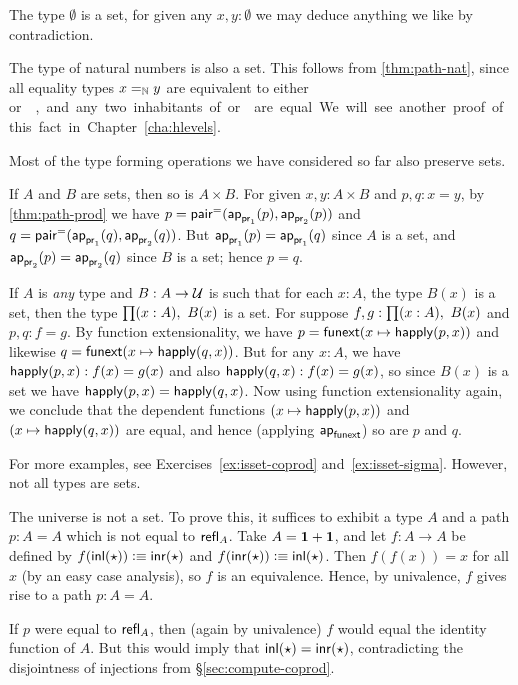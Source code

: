 \begin{eg}
  The type $\emptyset$ is a set, for given any $x,y:\emptyset$ we may deduce anything we like by contradiction.
\end{eg}

\begin{eg}
  The type \nat of natural numbers is also a set.
  This follows from \autoref{thm:path-nat}, since all equality types $\id[\nat]xy$ are equivalent to either \unit or \emptyt, and any two inhabitants of \unit or \emptyt are equal.
  We will see another proof of this fact in Chapter~\ref{cha:hlevels}.
\end{eg}

Most of the type forming operations we have considered so far also preserve sets.

\begin{eg}\label{thm:isset-prod}
  If $A$ and $B$ are sets, then so is $A\times B$.
  For given $x,y:A\times B$ and $p,q:x=y$, by \autoref{thm:path-prod} we have $p= \pairpath(\projpath1(p),\projpath2(p))$ and $q= \pairpath(\projpath1(q),\projpath2(q))$.
  But $\projpath1(p)=\projpath1(q)$ since $A$ is a set, and $\projpath2(p)=\projpath2(q)$ since $B$ is a set; hence $p=q$.
\end{eg}

\begin{eg}\label{thm:isset-forall}
  If $A$ is \emph{any} type and $B:A\to \type$ is such that for each $x:A$, the type $B(x)$ is a set, then the type $\prd{x:A} B(x)$ is a set.
  For suppose $f,g:\prd{x:A} B(x)$ and $p,q:f=g$.
  By function extensionality, we have $p = {\funext (x \mapsto \happly(p,x))}$ and likewise $q = {\funext (x \mapsto \happly(q,x))}$.
  But for any $x:A$, we have $\happly(p,x):f(x)=g(x)$ and also $\happly(q,x):f(x)=g(x)$, so since $B(x)$ is a set we have $\happly(p,x) = \happly(q,x)$.
  Now using function extensionality again, we conclude that the dependent functions $(x \mapsto \happly(p,x))$ and $(x \mapsto \happly(q,x))$ are equal, and hence (applying $\apfunc{\funext}$) so are $p$ and $q$.
\end{eg}

For more examples, see Exercises~\ref{ex:isset-coprod} and~\ref{ex:isset-sigma}.
However, not all types are sets.

\begin{eg}\label{thm:type-is-not-a-set}
  The universe \type is not a set.
  To prove this, it suffices to exhibit a type $A$ and a path $p:A=A$ which is not equal to $\refl A$.
  Take $A=\unit+\unit$, and let $f:A\to A$ be defined by $f(\inl(\ttt))\defeq \inr(\ttt)$ and $f(\inr(\ttt))\defeq \inl(\ttt)$.
  Then $f(f(x))=x$ for all $x$ (by an easy case analysis), so $f$ is an equivalence.
  Hence, by univalence, $f$ gives rise to a path $p:A=A$.

  If $p$ were equal to $\refl A$, then (again by univalence) $f$ would equal the identity function of $A$.
  But this would imply that $\inl(\ttt)=\inr(\ttt)$, contradicting the disjointness of injections from \S\ref{sec:compute-coprod}.
\end{eg}

